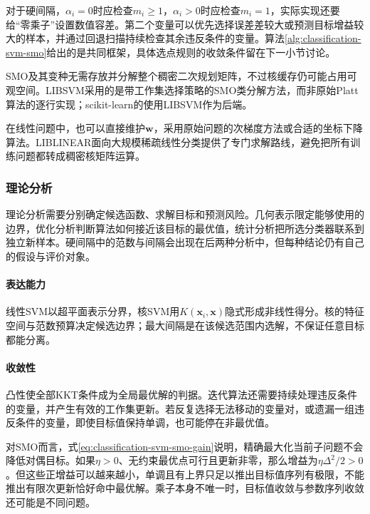 对于硬间隔，$\alpha_i=0$时应检查$m_i\ge1$，$\alpha_i>0$时应检查$m_i=1$，实际实现还要给“零乘子”设置数值容差。第二个变量可以优先选择误差差较大或预测目标增益较大的样本，并通过回退扫描持续检查其余违反条件的变量。算法\ref{alg:classification-svm-smo}给出的是共同框架，具体选点规则的收敛条件留在下一小节讨论。

SMO及其变种无需存放并分解整个稠密二次规划矩阵，不过核缓存仍可能占用可观空间。LIBSVM采用的是带工作集选择策略的SMO类分解方法，而非原始Platt算法的逐行实现；scikit-learn的使用LIBSVM作为后端。

在线性问题中，也可以直接维护$\bm{w}$，采用原始问题的次梯度方法或合适的坐标下降算法。LIBLINEAR面向大规模稀疏线性分类提供了专门求解路线，避免把所有训练问题都转成稠密核矩阵运算。

\subsubsection{理论分析}
\label{sec:classification-svm-analysis}

理论分析需要分别确定候选函数、求解目标和预测风险。几何表示限定能够使用的边界，优化分析判断算法如何接近该目标的最优值，统计分析把所选分类器联系到独立新样本。硬间隔中的范数与间隔会出现在后两种分析中，但每种结论仍有自己的假设与评价对象。

\paragraph{表达能力}
线性SVM以超平面表示分界，核SVM用$K(\bm x_i,\bm x)$隐式形成非线性得分。核的特征空间与范数预算决定候选边界；最大间隔是在该候选范围内选解，不保证任意目标都能分离。

\paragraph{收敛性}
\label{sec:classification-svm-convergence}

凸性使全部KKT条件成为全局最优解的判据。迭代算法还需要持续处理违反条件的变量，并产生有效的工作集更新。若反复选择无法移动的变量对，或遗漏一组违反条件的变量，即使目标值保持单调，也可能停在非最优值。

对SMO而言，式\eqref{eq:classification-svm-smo-gain}说明，精确最大化当前子问题不会降低对偶目标。如果$\eta>0$、无约束最优点可行且更新非零，那么增益为$\eta\Delta^2/2>0$。但这些正增益可以越来越小，单调且有上界只足以推出目标值序列有极限，不能推出有限次更新恰好命中最优解。乘子本身不唯一时，目标值收敛与参数序列收敛还可能是不同问题。

